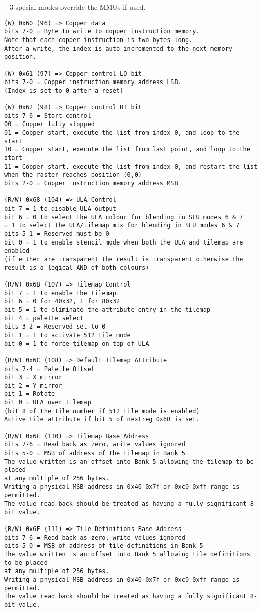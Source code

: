 +3 special modes override the MMUs if used.
\begin{verbatim}
(W) 0x60 (96) => Copper data
bits 7-0 = Byte to write to copper instruction memory.
Note that each copper instruction is two bytes long.
After a write, the index is auto-incremented to the next memory position.

(W) 0x61 (97) => Copper control LO bit
bits 7-0 = Copper instruction memory address LSB.
(Index is set to 0 after a reset)

(W) 0x62 (98) => Copper control HI bit
bits 7-6 = Start control
00 = Copper fully stopped
01 = Copper start, execute the list from index 0, and loop to the start
10 = Copper start, execute the list from last point, and loop to the
start
11 = Copper start, execute the list from index 0, and restart the list
when the raster reaches position (0,0)
bits 2-0 = Copper instruction memory address MSB

(R/W) 0x68 (104) => ULA Control
bit 7 = 1 to disable ULA output
bit 6 = 0 to select the ULA colour for blending in SLU modes 6 & 7
= 1 to select the ULA/tilemap mix for blending in SLU modes 6 & 7
bits 5-1 = Reserved must be 0
bit 0 = 1 to enable stencil mode when both the ULA and tilemap are enabled
(if either are transparent the result is transparent otherwise the
result is a logical AND of both colours)

(R/W) 0x6B (107) => Tilemap Control
bit 7 = 1 to enable the tilemap
bit 6 = 0 for 40x32, 1 for 80x32
bit 5 = 1 to eliminate the attribute entry in the tilemap
bit 4 = palette select
bits 3-2 = Reserved set to 0
bit 1 = 1 to activate 512 tile mode
bit 0 = 1 to force tilemap on top of ULA

(R/W) 0x6C (108) => Default Tilemap Attribute
bits 7-4 = Palette Offset
bit 3 = X mirror
bit 2 = Y mirror
bit 1 = Rotate
bit 0 = ULA over tilemap
(bit 8 of the tile number if 512 tile mode is enabled)
Active tile attribute if bit 5 of nextreg 0x6B is set.

(R/W) 0x6E (110) => Tilemap Base Address
bits 7-6 = Read back as zero, write values ignored
bits 5-0 = MSB of address of the tilemap in Bank 5
The value written is an offset into Bank 5 allowing the tilemap to be placed
at any multiple of 256 bytes.
Writing a physical MSB address in 0x40-0x7f or 0xc0-0xff range is permitted.
The value read back should be treated as having a fully significant 8-bit value.

(R/W) 0x6F (111) => Tile Definitions Base Address
bits 7-6 = Read back as zero, write values ignored
bits 5-0 = MSB of address of tile definitions in Bank 5
The value written is an offset into Bank 5 allowing tile definitions to be placed
at any multiple of 256 bytes.
Writing a physical MSB address in 0x40-0x7f or 0xc0-0xff range is permitted.
The value read back should be treated as having a fully significant 8-bit value.


\end{verbatim}
